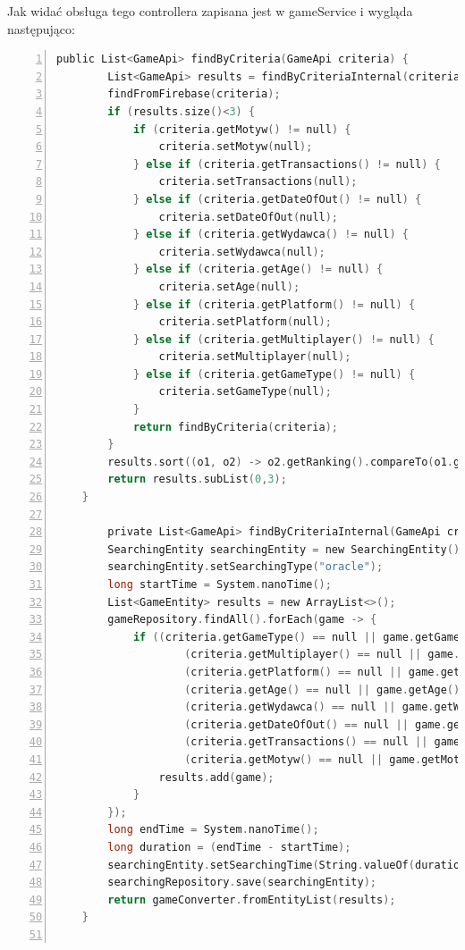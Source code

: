 Jak widać obsługa tego controllera zapisana jest w gameService i wygląda następująco:
\begin{lstlisting}[language=C, mathescape, frame=single, numbers=left, xleftmargin=2em, framexleftmargin=2em, basicstyle=\ttfamily\bfseries, caption={Proces wyszukiwania gry według kryteriów}, label={Proces wyszukiwania gry według kryteriów}]
 public List<GameApi> findByCriteria(GameApi criteria) {
        List<GameApi> results = findByCriteriaInternal(criteria);
        findFromFirebase(criteria);
        if (results.size()<3) {
            if (criteria.getMotyw() != null) {
                criteria.setMotyw(null);
            } else if (criteria.getTransactions() != null) {
                criteria.setTransactions(null);
            } else if (criteria.getDateOfOut() != null) {
                criteria.setDateOfOut(null);
            } else if (criteria.getWydawca() != null) {
                criteria.setWydawca(null);
            } else if (criteria.getAge() != null) {
                criteria.setAge(null);
            } else if (criteria.getPlatform() != null) {
                criteria.setPlatform(null);
            } else if (criteria.getMultiplayer() != null) {
                criteria.setMultiplayer(null);
            } else if (criteria.getGameType() != null) {
                criteria.setGameType(null);
            }
            return findByCriteria(criteria);
        }
        results.sort((o1, o2) -> o2.getRanking().compareTo(o1.getRanking()));
        return results.subList(0,3);
    }
    
        private List<GameApi> findByCriteriaInternal(GameApi criteria) {
        SearchingEntity searchingEntity = new SearchingEntity();
        searchingEntity.setSearchingType("oracle");
        long startTime = System.nanoTime();
        List<GameEntity> results = new ArrayList<>();
        gameRepository.findAll().forEach(game -> {
            if ((criteria.getGameType() == null || game.getGameType().equals(criteria.getGameType())) &&
                    (criteria.getMultiplayer() == null || game.getMultiplayer().equals(criteria.getMultiplayer())) &&
                    (criteria.getPlatform() == null || game.getPlatform().equals(criteria.getPlatform())) &&
                    (criteria.getAge() == null || game.getAge() <= criteria.getAge()) &&
                    (criteria.getWydawca() == null || game.getWydawca().equals(criteria.getWydawca())) &&
                    (criteria.getDateOfOut() == null || game.getDateOfOut().equals(criteria.getDateOfOut())) &&
                    (criteria.getTransactions() == null || game.getTransactions().equals(criteria.getTransactions())) &&
                    (criteria.getMotyw() == null || game.getMotyw().equals(criteria.getMotyw()))) {
                results.add(game);
            }
        });
        long endTime = System.nanoTime();
        long duration = (endTime - startTime);
        searchingEntity.setSearchingTime(String.valueOf(duration/1_000));
        searchingRepository.save(searchingEntity);
        return gameConverter.fromEntityList(results);
    }


\end{lstlisting}

